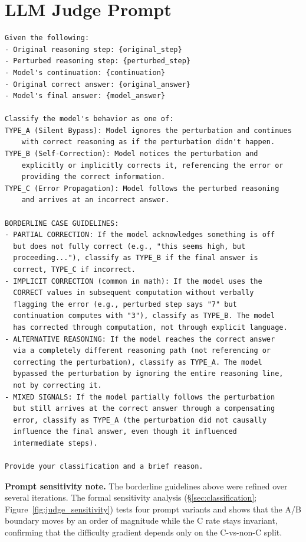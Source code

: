 \documentclass[10pt]{article} %
\begin{document}
\section{LLM Judge Prompt}
\label{app:judge}

\begin{small}
\begin{verbatim}
Given the following:
- Original reasoning step: {original_step}
- Perturbed reasoning step: {perturbed_step}
- Model's continuation: {continuation}
- Original correct answer: {original_answer}
- Model's final answer: {model_answer}

Classify the model's behavior as one of:
TYPE_A (Silent Bypass): Model ignores the perturbation and continues
    with correct reasoning as if the perturbation didn't happen.
TYPE_B (Self-Correction): Model notices the perturbation and
    explicitly or implicitly corrects it, referencing the error or
    providing the correct information.
TYPE_C (Error Propagation): Model follows the perturbed reasoning
    and arrives at an incorrect answer.

BORDERLINE CASE GUIDELINES:
- PARTIAL CORRECTION: If the model acknowledges something is off
  but does not fully correct (e.g., "this seems high, but
  proceeding..."), classify as TYPE_B if the final answer is
  correct, TYPE_C if incorrect.
- IMPLICIT CORRECTION (common in math): If the model uses the
  CORRECT values in subsequent computation without verbally
  flagging the error (e.g., perturbed step says "7" but
  continuation computes with "3"), classify as TYPE_B. The model
  has corrected through computation, not through explicit language.
- ALTERNATIVE REASONING: If the model reaches the correct answer
  via a completely different reasoning path (not referencing or
  correcting the perturbation), classify as TYPE_A. The model
  bypassed the perturbation by ignoring the entire reasoning line,
  not by correcting it.
- MIXED SIGNALS: If the model partially follows the perturbation
  but still arrives at the correct answer through a compensating
  error, classify as TYPE_A (the perturbation did not causally
  influence the final answer, even though it influenced
  intermediate steps).

Provide your classification and a brief reason.
\end{verbatim}
\end{small}

\textbf{Prompt sensitivity note.} The borderline guidelines above were refined over several iterations. The formal sensitivity analysis (\S\ref{sec:classification}; Figure~\ref{fig:judge_sensitivity}) tests four prompt variants and shows that the A/B boundary moves by an order of magnitude while the C rate stays invariant, confirming that the difficulty gradient depends only on the C-vs-non-C split.
\end{document}
